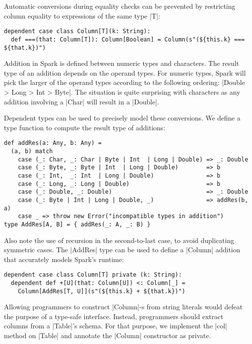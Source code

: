 Automatic conversions during equality checks can be prevented by restricting column equality to expressions of the same type |T|:

\begin{lstlisting}
dependent case class Column[T](k: String):
  def ===(that: Column[T]): Column[Boolean] = Column(s"(${this.k} === ${that.k})")
\end{lstlisting}

Addition in Spark is defined between numeric types and characters.
The result type of an addition depends on the operand types.
For numeric types, Spark will pick the larger of the operand types according to the following ordering: |Double > Long > Int > Byte|.
The situation is quite surprising with characters as any addition involving a |Char| will result in a |Double|.

Dependent types can be used to precisely model these conversions.
We define a type function to compute the result type of additions:

\begin{lstlisting}
def addRes(a: Any, b: Any) =
  (a, b) match
    case (_: Char, _: Char | Byte | Int  | Long | Double) => _: Double
    case (_: Byte, _: Byte | Int  | Long | Double)        => b
    case (_: Int,  _: Int  | Long | Double)               => b
    case (_: Long, _: Long | Double)                      => b
    case (_: Double, _: Double)                           => _: Double
    case (_: Byte | Int | Long | Double, _)               => addRes(b, a)
    case _ => throw new Error("incompatible types in addition")
type AddRes[A, B] = { addRes(_: A, _: B) }
\end{lstlisting}

Also note the use of recursion in the second-to-last case, to avoid duplicating symmetric cases.
The |AddRes| type can be used to define a |Column| addition that accurately models Spark's runtime:

\begin{lstlisting}
dependent case class Column[T] private (k: String):
  dependent def +[U](that: Column[U]) <: Column[_] =
    Column[AddRes[T, U]](s"(${this.k} + ${that.k})")
\end{lstlisting}

Allowing programmers to construct |Column|-s from string literals would defeat the purpose of a type-safe interface.
Instead, programmers should extract columns from a |Table|'s schema.
For that purpose, we implement the |col| method on |Table| and annotate the |Column| constructor as private.


